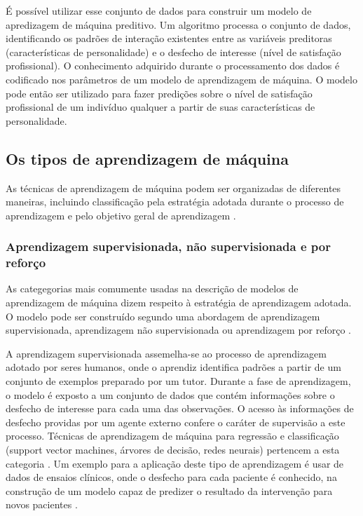 É possível utilizar esse conjunto de dados para construir um modelo de apredizagem de máquina preditivo. Um algoritmo processa o conjunto de dados,
identificando os padrões de interação existentes entre as variáveis preditoras (características de personalidade) e o desfecho de interesse (nível
de satisfação profissional). O conhecimento adquirido durante o processamento dos dados é codificado nos parâmetros de um modelo de aprendizagem de
máquina. O modelo pode então ser utilizado para fazer predições sobre o nível de satisfação profissional de um indivíduo qualquer a partir de suas
características de personalidade.

\subsection{Os tipos de aprendizagem de máquina}
As técnicas de aprendizagem de máquina podem ser organizadas de diferentes maneiras, incluindo classificação pela estratégia adotada durante o processo
de aprendizagem e pelo objetivo geral de aprendizagem \cite{Theobald2021, Ng2001}.

\subsubsection{Aprendizagem supervisionada, não supervisionada e por reforço}
As categegorias mais comumente usadas na descrição de modelos de aprendizagem de máquina dizem respeito à estratégia de aprendizagem adotada. O
modelo pode ser construído segundo uma abordagem de aprendizagem supervisionada, aprendizagem não supervisionada ou aprendizagem por reforço
\cite{Theobald2021, Bi2019}.

A aprendizagem supervisionada assemelha-se ao processo de aprendizagem adotado por seres humanos, onde o aprendiz identifica padrões a partir de
um conjunto de exemplos preparado por um tutor. Durante a fase de aprendizagem, o modelo é exposto a um conjunto de dados que contém informações
sobre o desfecho de interesse para cada uma das observações. O acesso às informações de desfecho providas por um agente externo confere o caráter
de supervisão a este processo. Técnicas de aprendizagem de máquina para regressão e classificação (support vector machines, árvores de decisão,
redes neurais) pertencem a esta categoria \cite{Theobald2021, Bi2019}. Um exemplo para a aplicação deste tipo de aprendizagem é usar de dados de
ensaios clínicos, onde o desfecho para cada paciente é conhecido, na construção de um modelo capaz de predizer o resultado da intervenção para
novos pacientes \cite{Collins2023}.

